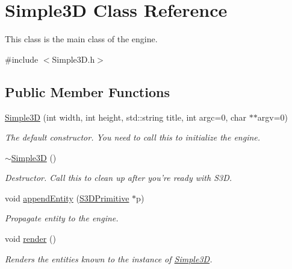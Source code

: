\hypertarget{class_simple3_d}{
\section{Simple3D Class Reference}
\label{class_simple3_d}
}


This class is the main class of the engine.  




{\ttfamily \#include $<$Simple3D.h$>$}

\subsection*{Public Member Functions}
\begin{DoxyCompactItemize}
\item 
\hyperlink{class_simple3_d_a7644ace43261dd71e7f3cb9c9659025d}{Simple3D} (int width, int height, std::string title, int argc=0, char $\ast$$\ast$argv=0)
\begin{DoxyCompactList}\small\item\em The default constructor. You need to call this to initialize the engine. \item\end{DoxyCompactList}\item 
\hyperlink{class_simple3_d_a859666c712fd07748e9fca5938bbfa55}{$\sim$Simple3D} ()
\begin{DoxyCompactList}\small\item\em Destructor. Call this to clean up after you're ready with S3D. \item\end{DoxyCompactList}\item 
void \hyperlink{class_simple3_d_abe4d7beed767d1d24154738fad7ac1a7}{appendEntity} (\hyperlink{class_s3_d_primitive}{S3DPrimitive} $\ast$p)
\begin{DoxyCompactList}\small\item\em Propagate entity to the engine. \item\end{DoxyCompactList}\item 
void \hyperlink{class_simple3_d_ab98d8b6cfb6abf91b43a035ab36f75f8}{render} ()
\begin{DoxyCompactList}\small\item\em Renders the entities known to the instance of \hyperlink{class_simple3_d}{Simple3D}. \item\end{DoxyCompactList}\item 
$$
\end{DoxyCompactItemize}
